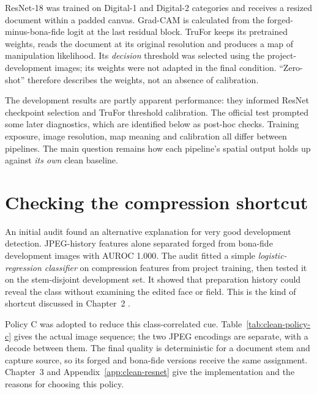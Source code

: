 ResNet-18 was trained on Digital-1 and Digital-2 categories and receives a resized document within a padded canvas. Grad-CAM is calculated from the forged-minus-bona-fide logit at the last residual block. TruFor keeps its pretrained weights, reads the document at its original resolution and produces a map of manipulation likelihood. Its \emph{decision} threshold was selected using the project-development images; its weights were not adapted in the final condition. ``Zero-shot'' therefore describes the weights, not an absence of calibration. 

The development results are partly apparent performance: they informed ResNet checkpoint selection and TruFor threshold calibration. The official test prompted some later diagnostics, which are identified below as post-hoc checks. Training exposure, image resolution, map meaning and calibration all differ between pipelines. The main question remains how each pipeline's spatial output holds up against \emph{its own} clean baseline.

\section{Checking the compression shortcut}
\label{sec:clean-shortcut}

An initial audit found an alternative explanation for very good development detection. JPEG-history features alone separated forged from bona-fide development images with AUROC 1.000. The audit fitted a simple \emph{logistic-regression classifier} on compression features from project training, then tested it on the stem-disjoint development set. It showed that preparation history could reveal the class without examining the edited face or field. This is the kind of shortcut discussed in Chapter~2 \citep{geirhos2020shortcut}.

Policy C was adopted to reduce this class-correlated cue. Table~\ref{tab:clean-policy-c} gives the actual image sequence; the two JPEG encodings are separate, with a decode between them. The final quality is deterministic for a document stem and capture source, so its forged and bona-fide versions receive the same assignment. Chapter~3 and Appendix~\ref{app:clean-resnet} give the implementation and the reasons for choosing this policy.

